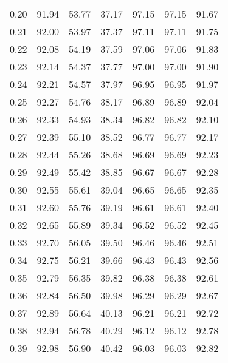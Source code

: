 \begin{tabular}{|c|c|c|c|c|c|c|}
      0.20 &     91.94 &     53.77 &      37.17 &   97.15 &      97.15 &         91.67 \\
      0.21 &     92.00 &     53.97 &      37.37 &   97.11 &      97.11 &         91.75 \\
      0.22 &     92.08 &     54.19 &      37.59 &   97.06 &      97.06 &         91.83 \\
      0.23 &     92.14 &     54.37 &      37.77 &   97.00 &      97.00 &         91.90 \\
      0.24 &     92.21 &     54.57 &      37.97 &   96.95 &      96.95 &         91.97 \\
      0.25 &     92.27 &     54.76 &      38.17 &   96.89 &      96.89 &         92.04 \\
      0.26 &     92.33 &     54.93 &      38.34 &   96.82 &      96.82 &         92.10 \\
      0.27 &     92.39 &     55.10 &      38.52 &   96.77 &      96.77 &         92.17 \\
      0.28 &     92.44 &     55.26 &      38.68 &   96.69 &      96.69 &         92.23 \\
      0.29 &     92.49 &     55.42 &      38.85 &   96.67 &      96.67 &         92.28 \\
      0.30 &     92.55 &     55.61 &      39.04 &   96.65 &      96.65 &         92.35 \\
      0.31 &     92.60 &     55.76 &      39.19 &   96.61 &      96.61 &         92.40 \\
      0.32 &     92.65 &     55.89 &      39.34 &   96.52 &      96.52 &         92.45 \\
      0.33 &     92.70 &     56.05 &      39.50 &   96.46 &      96.46 &         92.51 \\
      0.34 &     92.75 &     56.21 &      39.66 &   96.43 &      96.43 &         92.56 \\
      0.35 &     92.79 &     56.35 &      39.82 &   96.38 &      96.38 &         92.61 \\
      0.36 &     92.84 &     56.50 &      39.98 &   96.29 &      96.29 &         92.67 \\
      0.37 &     92.89 &     56.64 &      40.13 &   96.21 &      96.21 &         92.72 \\
      0.38 &     92.94 &     56.78 &      40.29 &   96.12 &      96.12 &         92.78 \\
      0.39 &     92.98 &     56.90 &      40.42 &   96.03 &      96.03 &         92.82 \\

\end{tabular}
